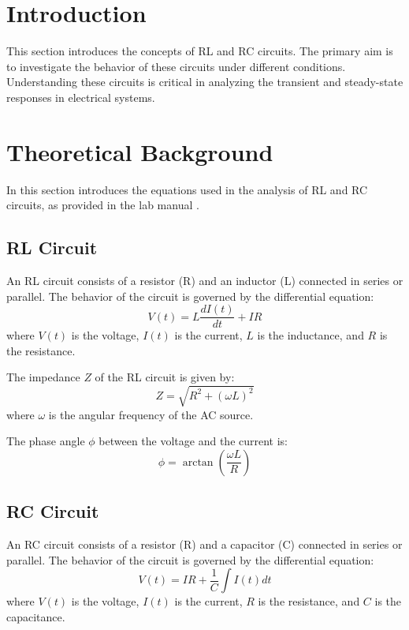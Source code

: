 \documentclass[journal]{IEEEtran}
\begin{document}
\section{Introduction}
This section introduces the concepts of RL and RC circuits. The primary aim is to investigate the behavior of these circuits under different conditions. Understanding these circuits is critical in analyzing the transient and steady-state responses in electrical systems.

\section{Theoretical Background}
In this section introduces the equations used in the analysis of RL and RC circuits, as provided in the lab manual \cite{lab_manual}.

\subsection{RL Circuit}
An RL circuit consists of a resistor (R) and an inductor (L) connected in series or parallel. The behavior of the circuit is governed by the differential equation:
\begin{equation}
    V(t) = L \frac{dI(t)}{dt} + IR \label{eq:rl_voltage}
\end{equation}
where \(V(t)\) is the voltage, \(I(t)\) is the current, \(L\) is the inductance, and \(R\) is the resistance.

The impedance \(Z\) of the RL circuit is given by:
\begin{equation}
    Z = \sqrt{R^2 + (\omega L)^2} \label{eq:rl_impedance}
\end{equation}
where \(\omega\) is the angular frequency of the AC source.

The phase angle \(\phi\) between the voltage and the current is:
\begin{equation}
    \phi = \arctan\left(\frac{\omega L}{R}\right) \label{eq:rl_phase}
\end{equation}

\subsection{RC Circuit}
An RC circuit consists of a resistor (R) and a capacitor (C) connected in series or parallel. The behavior of the circuit is governed by the differential equation:
\begin{equation}
    V(t) = IR + \frac{1}{C} \int I(t) dt \label{eq:rc_voltage}
\end{equation}
where \(V(t)\) is the voltage, \(I(t)\) is the current, \(R\) is the resistance, and \(C\) is the capacitance.
\end{document}
